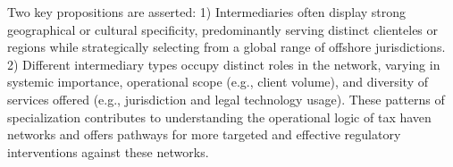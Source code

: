 \documentclass[12pt, a4paper]{report}
\begin{document}
Two key propositions are asserted: 1) Intermediaries often display strong geographical or cultural specificity, predominantly serving distinct clienteles or regions while strategically selecting from a global range of offshore jurisdictions. 2) Different intermediary types occupy distinct roles in the network, varying in systemic importance, operational scope (e.g., client volume), and diversity of services offered (e.g., jurisdiction and legal technology usage). These patterns of specialization contributes to understanding the operational logic of tax haven networks and offers pathways for more targeted and effective regulatory interventions against these networks.

\pagestyle{fancy} %








\appendix



\printbibliography


\end{document}
